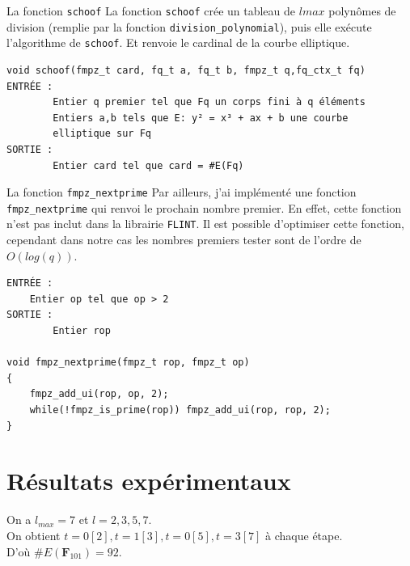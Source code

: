 \documentclass[french, lmodern]{beamer}
\begin{document}
\begin{frame}[fragile]{La fonction \texttt{schoof}}
\transwipe
La fonction \texttt{schoof} crée un tableau de $lmax$ polynômes de division (remplie par la fonction \texttt{division\_polynomial}), puis elle exécute l'algorithme de \texttt{schoof}. Et renvoie le cardinal de la courbe elliptique.
\begin{verbatim}
void schoof(fmpz_t card, fq_t a, fq_t b, fmpz_t q,fq_ctx_t fq)
ENTRÉE :
    	Entier q premier tel que Fq un corps fini à q éléments
    	Entiers a,b tels que E: y² = x³ + ax + b une courbe 
    	elliptique sur Fq
SORTIE :
    	Entier card tel que card = #E(Fq)
\end{verbatim} 
\end{frame}


\begin{frame}[fragile]{La fonction \texttt{fmpz\_nextprime}}
\transwipe
Par ailleurs, j'ai implémenté une fonction \texttt{fmpz\_nextprime} qui renvoi le prochain nombre premier. 
En effet, cette fonction n'est pas inclut dans la librairie \texttt{FLINT}. Il est possible d'optimiser cette fonction, cependant dans notre cas les nombres premiers tester sont de l'ordre de $O(log(q))$.
\begin{verbatim}
ENTRÉE :
   	Entier op tel que op > 2
SORTIE :
    	Entier rop
    	
void fmpz_nextprime(fmpz_t rop, fmpz_t op)
{
    fmpz_add_ui(rop, op, 2);
    while(!fmpz_is_prime(rop)) fmpz_add_ui(rop, rop, 2);
}
\end{verbatim}
\end{frame}

\section{Résultats expérimentaux}
\begin{frame}
\transwipe
\begin{example}[Soit $p=101$ et $E : y^{2} = x^{3} + 3x + 4$]
On a $l_{max} = 7$  et $l = 2, 3, 5, 7$.\\
On obtient $t=0[2], t=1[3], t=0[5], t=3[7]$ à chaque étape.\\
D'où $\#E(\mathbf{F}_{101}) = 92$.
\end{example}
\end{frame}

\begin{frame}
\transwipe
\begin{center}
\end{center}
\end{frame}
 
\end{document}
